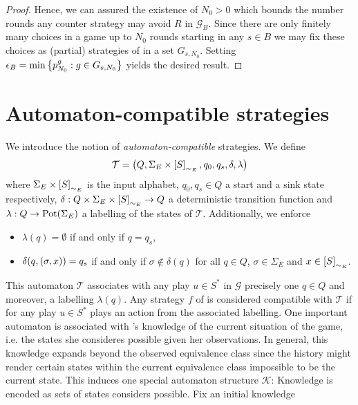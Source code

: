 \begin{proof}
  Hence, we can assured the existence of $N_{0} > 0$ which bounds the number
  rounds any counter strategy may avoid $R$ in $\mathcal{G}_{B}$. Since there
  are only finitely many choices in a game up to $N_{0}$ rounds starting in
  any $s\in B$ we may fix these choices as (partial) strategies of \adam{} in a
  set $G_{s,N_{0}}$. Setting 
  $\epsilon_{B} = \min\left\{p^{g}_{N_{0}}:g\in G_{s, N_{0}}\right\}$ yields the desired 
  result.
\end{proof}

\section{Automaton-compatible strategies}
We introduce the notion of \emph{automaton-compatible} strategies. We define
\begin{equation*}
  \mathcal{T} = \left(Q, \Sigma_{E}\times \left[S\right]_{\sim_{E}}, q_{0}, 
  q_{s}, \delta, \lambda\right)
\end{equation*}
where $\Sigma_{E}\times \left[S\right]_{\sim_{E}}$ is the input alphabet, 
$q_{0}, q_{s}\in Q$ a start and a sink state respectively, 
$\delta:Q\times \Sigma_{E}\times \left[S\right]_{\sim_{E}}\rightarrow Q$ a 
deterministic transition function and $\lambda:Q\rightarrow\operatorname{Pot}(\Sigma_{E})$ a
labelling of the states of $\mathcal{T}$. Additionally, we enforce
\begin{itemize}
  \item $\lambda(q) = \emptyset$ if and only if $q = q_{s}$,
  \item $\delta(q, \left(\sigma, x\right)) = q_{s}$ if and only if 
    $\sigma\not\in\delta(q)$ for all $q\in Q$, $\sigma\in\Sigma_{E}$ and 
    $x\in\left[S\right]_{\sim_{E}}$.
\end{itemize}
This automaton $\mathcal{T}$ associates with any play $u\in S^{*}$ in 
$\mathcal{G}$ precisely one $q\in Q$ and moreover, a labelling $\lambda(q)$. 
Any strategy $f$ of \eve{} is considered compatible with $\mathcal{T}$ if for 
any play $u\in S^{*}$ \eve{} plays an action from the associated labelling. One
important automaton is associated with \eve{}'s knowledge of the current 
situation of the game, i.e. the states she consideres possible given her 
observations. In general, this knowledge expands beyond the observed 
equivalence class since the history might render certain states within the 
current equivalence class impossible to be the current state.
This induces one special automaton structure $\mathcal{K}$: Knowledge is 
encoded as sets of states \eve{} considers possible. Fix an initial knowledge 
